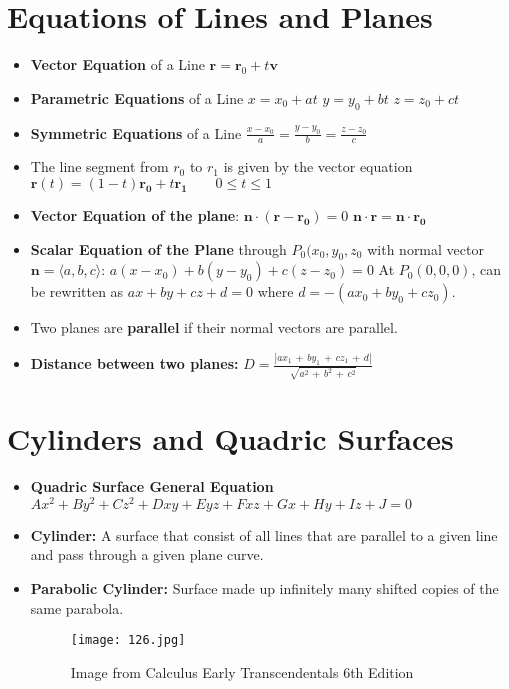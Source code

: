 \documentclass{report}
\begin{document}
	\section{Equations of Lines and Planes}
		\begin{itemize}\addtolength{\leftskip}{2em}
			\large\item \textbf{Vector Equation} of a Line 
			\subitem \Large $\mathbf{r}=\mathbf{r}_0+t\mathbf{v}$
			\large\item  \textbf{Parametric Equations} of a Line
				\subitem \Large $x=x_0+at$
				\subitem \Large $y=y_0+bt$
				\subitem \Large $z=z_0+ct$
			\large\item \textbf{Symmetric Equations} of a Line
				\subitem\huge $\frac{x-x_0}{a}=\frac{y-y_0}{b}=\frac{z-z_0}{c}$
			\large\item The line segment from $r_0$ to $r_1$ is given by the vector equation $\mathbf{r}(t)=(1-t)\mathbf{r_0}+t\mathbf{r_1}\quad\quad0\le t\le 1$
			\item \textbf{Vector Equation of the plane}:
			\subitem $\mathbf{n}\cdot (\mathbf{r}-\mathbf{r_0})=0$
			\subitem $\mathbf{n}\cdot\mathbf{r}=\mathbf{n}\cdot\mathbf{r_0}$
			\item \textbf{Scalar Equation of the Plane} through $P_0(x_0,y_0,z_0$ with normal vector $\mathbf{n}=\langle a,b,c\rangle$:
			\subitem \Large $a(x-x_0)+b(y-y_0)+c(z-z_0)=0$
			\large\subitem At $P_0(0,0,0)$, can be rewritten as $ax+by+cz+d=0$ where $d=-(ax_0+by_0+cz_0)$.
			\large\item Two planes are \textbf{parallel} if their normal vectors are parallel.
			\item \textbf{Distance between two planes:}
			\subitem\huge $D=\frac{|ax_1\,+\,by_1\,+\,cz_1\,+\,d|}{\sqrt{a^2\,+\,b^2\,+\,c^2}}$
		\end{itemize}
	\section{Cylinders and Quadric Surfaces}
		\begin{itemize}\addtolength{\leftskip}{2em}
			\item \textbf{Quadric Surface General Equation}
				\subitem $Ax^2+By^2+Cz^2+Dxy+Eyz+Fxz+Gx+Hy+Iz+J=0$
			\item \textbf{Cylinder:} A surface that consist of all lines that are parallel to a given line and pass through a given plane curve.
			\item \textbf{Parabolic Cylinder:} Surface made up infinitely many shifted copies of the same parabola.
			
			\begin{figure}[ht!]
			\centering
			\texttt{[image: 126.jpg]}
			\caption{\small Image from Calculus Early Transcendentals 6th Edition}
			\label{overflow}
			\end{figure}
		\end{itemize}
\end{document}
